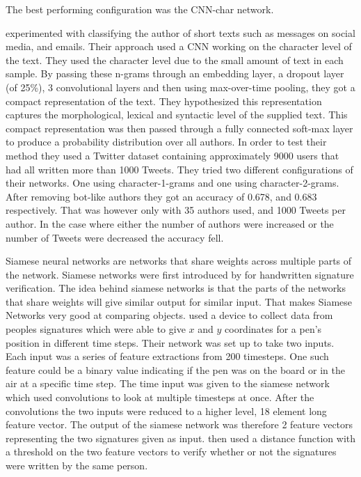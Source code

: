 The best performing configuration was the CNN-char network.

\citet{shrestha2017} experimented with classifying the author of short texts
such as messages on social media, and emails. Their approach used a \gls{CNN}
working on the character level of the text. They used the character level due
to the small amount of text in each sample. By passing these n-grams through
an embedding layer, a dropout layer (of 25\%), 3 convolutional layers and then
using max-over-time pooling, they got a compact representation of the text.
They hypothesized this representation captures the morphological, lexical
and syntactic level of the supplied text. This compact representation was
then passed through a fully connected soft-max layer to produce a probability
distribution over all authors. In order to test their method they used a Twitter
dataset containing approximately 9000 users that had all written more than 1000
Tweets. They tried two different configurations of their networks. One using
character-1-grams and one using character-2-grams. After removing bot-like
authors they got an accuracy of 0.678, and 0.683 respectively. That was however
only with 35 authors used, and 1000 Tweets per author. In the case where either
the number of authors were increased or the number of Tweets were decreased the
accuracy fell.

Siamese neural networks are networks that share weights across multiple parts
of the network. Siamese networks were first introduced by \citet{NIPS1993_769}
for handwritten signature verification. The idea behind siamese networks is
that the parts of the networks that share weights will give similar output for
similar input. That makes Siamese Networks very good at comparing objects.
\citet{NIPS1993_769} used a device to collect data from peoples signatures which
were able to give $x$ and $y$ coordinates for a pen's position in different time
steps. Their network was set up to take two inputs. Each input was a series
of feature extractions from 200 timesteps. One such feature could be a binary
value indicating if the pen was on the board or in the air at a specific time
step. The time input was given to the siamese network which used convolutions to
look at multiple timesteps at once. After the convolutions the two inputs were
reduced to a higher level, 18 element long feature vector. The output of the
siamese network was therefore 2 feature vectors representing the two signatures
given as input. \citet{NIPS1993_769} then used a distance function with a
threshold on the two feature vectors to verify whether or not the signatures
were written by the same person.

